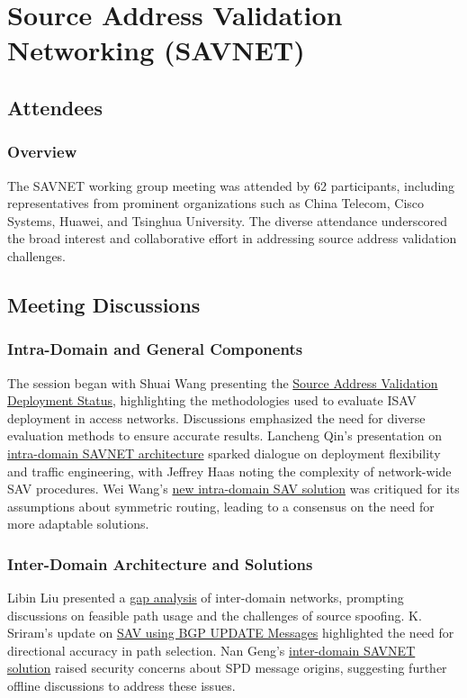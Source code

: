 \documentclass{article}
\begin{document}
\newpage

\section{Source Address Validation Networking (SAVNET)}

\subsection{Attendees}
\subsubsection{Overview}
The SAVNET working group meeting was attended by 62 participants, including representatives from prominent organizations such as China Telecom, Cisco Systems, Huawei, and Tsinghua University. The diverse attendance underscored the broad interest and collaborative effort in addressing source address validation challenges.

\subsection{Meeting Discussions}

\subsubsection{Intra-Domain and General Components}
The session began with Shuai Wang presenting the \href{https://datatracker.ietf.org/doc/draft-wang-sav-deployment-status/}{Source Address Validation Deployment Status}, highlighting the methodologies used to evaluate ISAV deployment in access networks. Discussions emphasized the need for diverse evaluation methods to ensure accurate results. Lancheng Qin's presentation on \href{https://datatracker.ietf.org/doc/draft-ietf-savnet-intra-domain-architecture/}{intra-domain SAVNET architecture} sparked dialogue on deployment flexibility and traffic engineering, with Jeffrey Haas noting the complexity of network-wide SAV procedures. Wei Wang's \href{https://datatracker.ietf.org/doc/draft-wang-savnet-intra-domain-solution-bm-spf/}{new intra-domain SAV solution} was critiqued for its assumptions about symmetric routing, leading to a consensus on the need for more adaptable solutions.

\subsubsection{Inter-Domain Architecture and Solutions}
Libin Liu presented a \href{https://datatracker.ietf.org/doc/draft-ietf-savnet-inter-domain-problem-statement/}{gap analysis} of inter-domain networks, prompting discussions on feasible path usage and the challenges of source spoofing. K. Sriram's update on \href{https://datatracker.ietf.org/doc/draft-ietf-sidrops-bar-sav/}{SAV using BGP UPDATE Messages} highlighted the need for directional accuracy in path selection. Nan Geng's \href{https://datatracker.ietf.org/doc/draft-geng-idr-bgp-savnet/}{inter-domain SAVNET solution} raised security concerns about SPD message origins, suggesting further offline discussions to address these issues.
\end{document}
